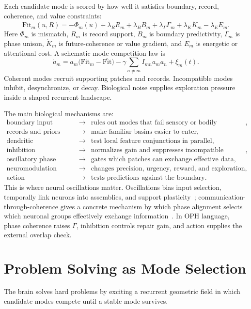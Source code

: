 \documentclass[11pt]{article}
\theoremstyle{remark}
\theoremstyle{plain}
\begin{document}
Each candidate mode is scored by how well it satisfies boundary, record, coherence, and value constraints:
\[
\boxed{
\mathrm{Fit}_m(u,R)
=
-\Phi_m(u)
+\lambda_R R_m
+\lambda_B B_m
+\lambda_\Gamma\Gamma_m
+\lambda_K \dot K_m
-\lambda_E E_m.
}
\]
Here \(\Phi_m\) is mismatch, \(R_m\) is record support, \(B_m\) is boundary predictivity, \(\Gamma_m\) is phase unison, \(\dot K_m\) is future-coherence or value gradient, and \(E_m\) is energetic or attentional cost. A schematic mode-competition law is
\[
\dot a_m
=
a_m\bigl(\mathrm{Fit}_m-\overline{\mathrm{Fit}}\bigr)
-\gamma\sum_{n\ne m}I_{mn}a_ma_n
+\xi_m(t).
\]
Coherent modes recruit supporting patches and records. Incompatible modes inhibit, desynchronize, or decay. Biological noise supplies exploration pressure inside a shaped recurrent landscape.

The main biological mechanisms are:
\[
\begin{array}{rcl}
\text{boundary input} &\to& \text{rules out modes that fail sensory or bodily prediction},\\
\text{records and priors} &\to& \text{make familiar basins easier to enter},\\
\text{dendritic nonlinearities} &\to& \text{test local feature conjunctions in parallel},\\
\text{inhibition} &\to& \text{normalizes gain and suppresses incompatible coalitions},\\
\text{oscillatory phase} &\to& \text{gates which patches can exchange effective data},\\
\text{neuromodulation} &\to& \text{changes precision, urgency, reward, and exploration},\\
\text{action} &\to& \text{tests predictions against the boundary}.
\end{array}
\]
This is where neural oscillations matter. Oscillations bias input selection, temporally link neurons into assemblies, and support plasticity~\cite{BuzsakiDraguhn2004}; communication-through-coherence gives a concrete mechanism by which phase alignment selects which neuronal groups effectively exchange information~\cite{Fries2015}. In OPH language, phase coherence raises \(\Gamma\), inhibition controls repair gain, and action supplies the external overlap check.

\section{Problem Solving as Mode Selection}

The brain solves hard problems by exciting a recurrent geometric field in which candidate modes compete until a stable mode survives.
\end{document}
